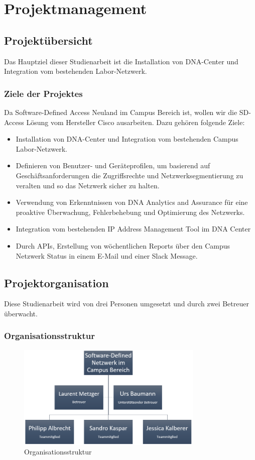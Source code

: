 \section{Projektmanagement}

\subsection{Projektübersicht}
Das Hauptziel dieser Studienarbeit ist die Installation von DNA-Center und Integration vom bestehenden Labor-Netzwerk.

\subsubsection{Ziele der Projektes}
Da Software-Defined Access Neuland im Campus Bereich ist, wollen wir die SD-Access Lösung vom Hersteller Cisco ausarbeiten. Dazu gehören folgende Ziele:

\begin{itemize}
	\item Installation von DNA-Center und Integration vom bestehenden Campus Labor-Netzwerk.
	\item Definieren von Benutzer- und Geräteprofilen, um basierend auf Geschäftsanforderungen die Zugriffsrechte und Netzwerksegmentierung zu veralten und so das Netzwerk sicher zu halten.
	\item Verwendung von Erkenntnissen von DNA Analytics and Assurance für eine proaktive Überwachung, Fehlerbehebung und Optimierung des Netzwerks.
	\item Integration vom bestehenden IP Address Management Tool im DNA Center
	\item Durch APIs, Erstellung von wöchentlichen Reports über den Campus Netzwerk Status in einem E-Mail und einer Slack Message. 
\end{itemize}

\subsection{Projektorganisation}
Diese Studienarbeit wird von drei Personen umgesetzt und durch zwei Betreuer überwacht.

\subsubsection{Organisationsstruktur}
\begin{figure}[H]
	\centering
	\includegraphics[height=5cm]{img/Organisationsstruktur.png}
	\caption{Organisationsstruktur}
	\label{fig:Organisationsstruktur}
\end{figure}

